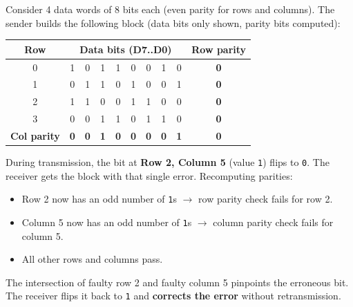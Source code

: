 \documentclass[11pt]{article}
\begin{document}
\begin{exemplebox}
Consider 4 data words of 8 bits each (even parity for rows and columns). The sender builds the following block (data bits only shown, parity bits computed):

\begin{center}
\begin{tabular}{|c|cccccccc|c|}
\hline
\rowcolor{popblueL}
\textbf{Row} & \multicolumn{8}{c|}{\textbf{Data bits (D7..D0)}} & \textbf{Row parity} \\ \hline
0 & 1 & 0 & 1 & 1 & 0 & 0 & 1 & 0 & \textbf{0} \\
1 & 0 & 1 & 1 & 0 & 1 & 0 & 0 & 1 & \textbf{0} \\
2 & 1 & 1 & 0 & 0 & 1 & 1 & 0 & 0 & \textbf{0} \\
3 & 0 & 0 & 1 & 1 & 0 & 1 & 1 & 0 & \textbf{0} \\ \hline
\textbf{Col parity} & \textbf{0} & \textbf{0} & \textbf{1} & \textbf{0} & \textbf{0} & \textbf{0} & \textbf{0} & \textbf{1} & \textbf{0} \\
\hline
\end{tabular}
\end{center}

During transmission, the bit at \textbf{Row 2, Column 5} (value \texttt{1}) flips to \texttt{0}. The receiver gets the block with that single error. Recomputing parities:
\begin{itemize}
\item Row 2 now has an odd number of \texttt{1}s $\rightarrow$ row parity check fails for row 2.
\item Column 5 now has an odd number of \texttt{1}s $\rightarrow$ column parity check fails for column 5.
\item All other rows and columns pass.
\end{itemize}
The intersection of faulty row 2 and faulty column 5 pinpoints the erroneous bit. The receiver flips it back to \texttt{1} and \textbf{corrects the error} without retransmission.
\end{exemplebox}
\end{document}
